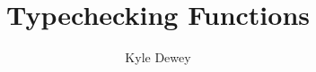 \documentclass[10pt]{article}
\begin{document}
\title{Typechecking Functions}
\author{Kyle Dewey}
\date{}
\maketitle




\end{document}

